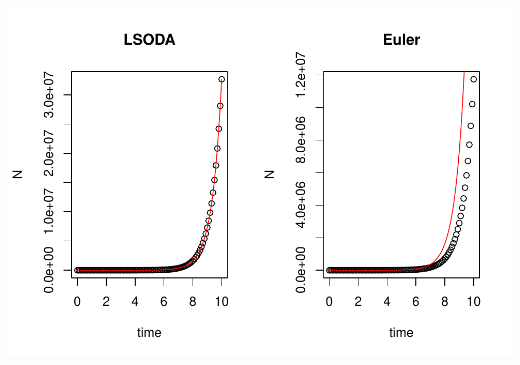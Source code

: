 \documentclass[
]{book}
\begin{document}
\includegraphics{bookdown-demo_files/figure-latex/unnamed-chunk-7-1.pdf}
\end{document}
